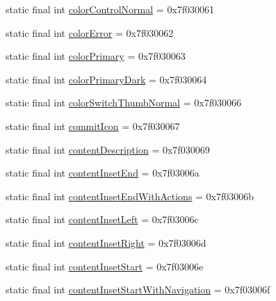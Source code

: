 \begin{DoxyCompactItemize}
\item 
static final int \mbox{\hyperlink{classandroid_1_1support_1_1design_1_1R_1_1attr_a90e1ede923ec8393bd6f1a3218f9836b}{color\+Control\+Normal}} = 0x7f030061
\item 
static final int \mbox{\hyperlink{classandroid_1_1support_1_1design_1_1R_1_1attr_a7786c29d02d412e4facdf912d6ec6714}{color\+Error}} = 0x7f030062
\item 
static final int \mbox{\hyperlink{classandroid_1_1support_1_1design_1_1R_1_1attr_ae16c90f75dbb495b67dbcc7d3b2d5875}{color\+Primary}} = 0x7f030063
\item 
static final int \mbox{\hyperlink{classandroid_1_1support_1_1design_1_1R_1_1attr_a03a2e86e19456d190709fd13c9245eff}{color\+Primary\+Dark}} = 0x7f030064
\item 
static final int \mbox{\hyperlink{classandroid_1_1support_1_1design_1_1R_1_1attr_a079f7b1cfe50d26938aeeea1cd78e6ad}{color\+Switch\+Thumb\+Normal}} = 0x7f030066
\item 
static final int \mbox{\hyperlink{classandroid_1_1support_1_1design_1_1R_1_1attr_a11bbc63f864f8a93e51e41de4ed8cb1b}{commit\+Icon}} = 0x7f030067
\item 
static final int \mbox{\hyperlink{classandroid_1_1support_1_1design_1_1R_1_1attr_ae78a680bbf1707e86baa2ecf2ce807ac}{content\+Description}} = 0x7f030069
\item 
static final int \mbox{\hyperlink{classandroid_1_1support_1_1design_1_1R_1_1attr_ade46dc0fa819b1068e4a9914ae7e17ea}{content\+Inset\+End}} = 0x7f03006a
\item 
static final int \mbox{\hyperlink{classandroid_1_1support_1_1design_1_1R_1_1attr_ab6569b42b5cae3a7779fd2eeadc3a67a}{content\+Inset\+End\+With\+Actions}} = 0x7f03006b
\item 
static final int \mbox{\hyperlink{classandroid_1_1support_1_1design_1_1R_1_1attr_a8de8b60fcce084326706615ffa0eb7fe}{content\+Inset\+Left}} = 0x7f03006c
\item 
static final int \mbox{\hyperlink{classandroid_1_1support_1_1design_1_1R_1_1attr_aecf3f2220db7da109fc27bc18b181056}{content\+Inset\+Right}} = 0x7f03006d
\item 
static final int \mbox{\hyperlink{classandroid_1_1support_1_1design_1_1R_1_1attr_a77f9dfd9dce9f6c88ca65515c38cdc14}{content\+Inset\+Start}} = 0x7f03006e
\item 
static final int \mbox{\hyperlink{classandroid_1_1support_1_1design_1_1R_1_1attr_aba4cd177615fac68e644a4ed00251b4b}{content\+Inset\+Start\+With\+Navigation}} = 0x7f03006f

\end{DoxyCompactItemize}
